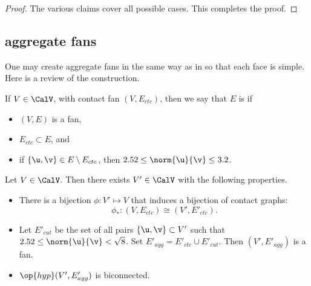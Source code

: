\begin{proof}
The various claims cover all possible cases.  This completes
the proof.
\end{proof}


\subsection{aggregate fans}

One may create aggregate fans in the same way as in
\cite{Hales:2006:DCG} so that each face is simple.  Here is a review
of the construction.  

\begin{definition}
If $V\in\CalV$, with contact fan $(V,E_{ctc})$, then we say that $E$ is  if
\begin{itemize}
\item $(V,E)$ is a fan,
\item $E_{ctc}\subset E$, and
\item if $\{\u,\v\}\in E\setminus E_{ctc}$, then $2.52\le\norm{\u}{\v}\le 3.2$.
\end{itemize}
%
%
\end{definition}

\begin{lemma} Let $V\in \CalV$.  Then there exists  $V'\in \CalV$ with the following
properties.
\begin{itemize}
\item There is a bijection $\phi:V'\mapsto V$ that induces a bijection of contact graphs:
\[
\phi_*:(V,E_{ctc}) \cong (V',E'_{ctc}).
\]
\item Let $E'_{cut}$ be the set of all pairs $\{\u,\v\}\subset V'$ such that $2.52\le\norm{\u}{\v} <\sqrt8$.
Set $E'_{agg} = E'_{ctc}\cup E'_{cut}$.
Then $(V',E'_{agg})$ is a fan.
\item $\op{hyp}(V',E'_{agg})$ is biconnected.
\end{itemize}
\end{lemma}

